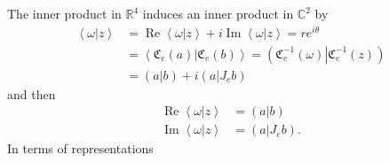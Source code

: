 \documentclass[aps,preprint]{revtex4}%
\begin{document}
The inner product in $\mathbb{R}^{4}$ induces an inner product in
$\mathbb{C}^{2}$ by
\begin{align}
\left\langle \left.  \omega\right\vert z\right\rangle  &  =\operatorname{Re}%
\left\langle \left.  \omega\right\vert z\right\rangle +i\operatorname{Im}%
\left\langle \left.  \omega\right\vert z\right\rangle =re^{i\theta}\\
&  =\left\langle \left.  \mathfrak{C}_{e}\left(  a\right)  \right\vert
\mathfrak{C}_{e}\left(  b\right)  \right\rangle =\left(  \left.
\mathfrak{C}_{e}^{-1}\left(  \omega\right)  \right\vert \mathfrak{C}_{e}%
^{-1}\left(  z\right)  \right) \\
&  =\left(  \left.  a\right\vert b\right)  +i\left(  \left.  a\right\vert
J_{e}b\right)
\end{align}
and then
\begin{align}
\operatorname{Re}\left\langle \left.  \omega\right\vert z\right\rangle  &
=\left(  \left.  a\right\vert b\right) \\
\operatorname{Im}\left\langle \left.  \omega\right\vert z\right\rangle  &
=\left(  \left.  a\right\vert J_{e}b\right)  .
\end{align}
In terms of representations
\end{document}
